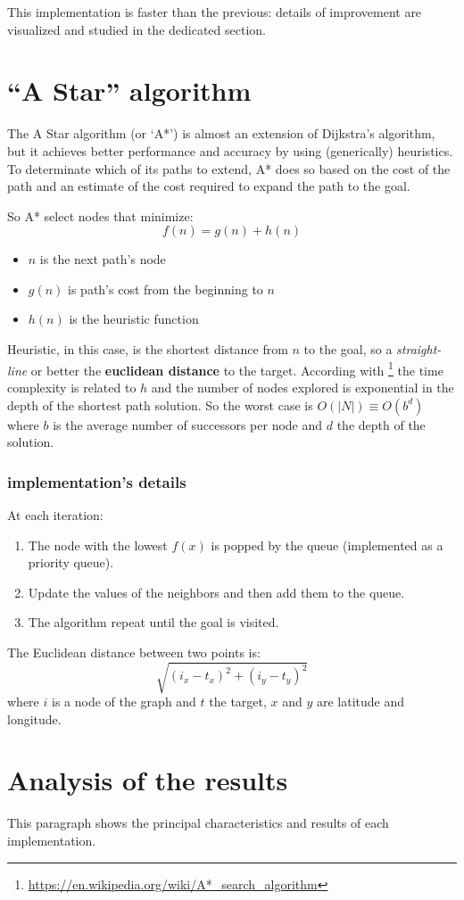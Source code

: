 \documentclass[a4paper,11pt]{report}
\begin{document}
This implementation is faster than the previous: details of improvement are visualized and studied in the dedicated section.

\section{``A Star'' algorithm}
The A Star algorithm (or `A*') is almost an extension of Dijkstra's algorithm, but it achieves better performance and accuracy by using (generically) heuristics. To determinate which of its paths to extend, A* does so based on the cost of the path and an estimate of the cost required to expand the path to the goal.

So A* select nodes that minimize:
$$ f(n) = g(n) + h(n)$$
\begin{itemize}
	\item $n$ is the next path's node
	\item $g(n)$ is path's cost from the beginning to $n$
	\item $h(n)$ is the heuristic function
\end{itemize}
Heuristic, in this case, is the shortest distance from $n$ to the goal, so a \textit{straight-line} or better the \textbf{euclidean distance} to the target.
According with \footnote{\url{https://en.wikipedia.org/wiki/A*_search_algorithm}} the time complexity is related to $h$ and the number of nodes explored is exponential in the depth of the shortest path solution.
So the worst case is $O(|N|) \equiv O(b^d)$ where $b$ is the average number of successors per node and $d$ the depth of the solution.
\subsubsection*{implementation's details}
At each iteration:
\begin{enumerate}
	\item The node with the lowest $f(x)$ is popped by the queue (implemented as a priority queue).
	\item Update the values of the neighbors and then add them to the queue.
	\item The algorithm repeat until the goal is visited.
\end{enumerate}
The Euclidean distance between two points is: $$\sqrt{(i_x - t_x)^2 + (i_y - t_y)^2}$$
where $i$ is a node of the graph and $t$ the target, $x$ and $y$ are latitude and longitude.


\section{Analysis of the results}
This paragraph shows the principal characteristics and results of each implementation.
\end{document}
